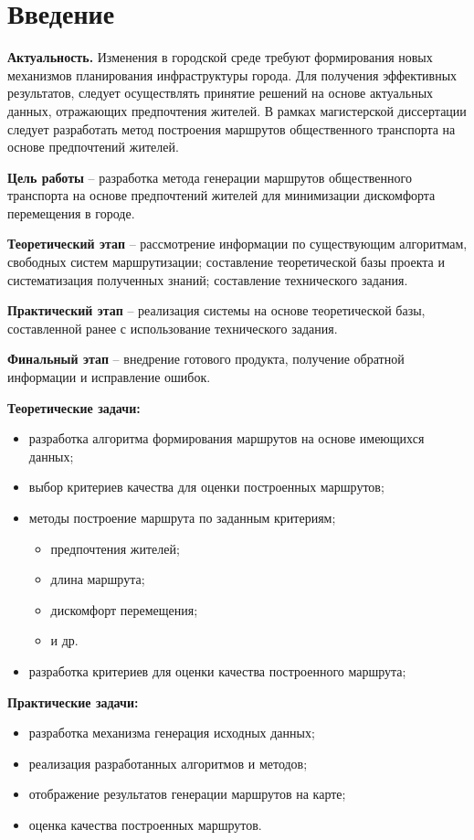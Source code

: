 \chapter{Введение}

\textbf{Актуальность.} Изменения в городской среде требуют формирования новых механизмов 
планирования инфраструктуры города. Для получения эффективных результатов, следует осуществлять 
принятие решений на основе актуальных данных, отражающих предпочтения жителей. В рамках 
магистерской диссертации следует разработать метод построения маршрутов общественного транспорта 
на основе предпочтений жителей.

\textbf{Цель работы} -- разработка метода генерации маршрутов общественного транспорта на основе 
предпочтений жителей для минимизации дискомфорта перемещения в городе.

\textbf{Теоретический этап} -- рассмотрение информации по существующим алгоритмам, свободных систем 
маршрутизации; составление теоретической базы проекта и систематизация полученных знаний; 
составление технического задания. 

\textbf{Практический этап} -- реализация системы на основе теоретической базы, составленной ранее с 
использование технического задания.

\textbf{Финальный этап} -- внедрение готового продукта, получение обратной информации и исправление 
ошибок.

\textbf{Теоретические задачи:}
\vspace*{-1em}
\begin{itemize}\itemsep-5pt
    \item разработка алгоритма формирования маршрутов на основе имеющихся данных;
    \item выбор критериев качества для оценки построенных маршрутов;
    \item методы построение маршрута по заданным критериям;
    \begin{itemize}\itemsep-5pt
        \item предпочтения жителей;
        \item длина маршрута;
        \item дискомфорт перемещения;
        \item и др.
    \end{itemize}
    \item разработка критериев для оценки качества построенного маршрута;
\end{itemize}
\textbf{Практические задачи:}
\vspace*{-1em}
\begin{itemize}\itemsep-5pt
    \item разработка механизма генерация исходных данных;
    \item реализация разработанных алгоритмов и методов;
    \item отображение результатов генерации маршрутов на карте;
    \item оценка качества построенных маршрутов.
\end{itemize}

